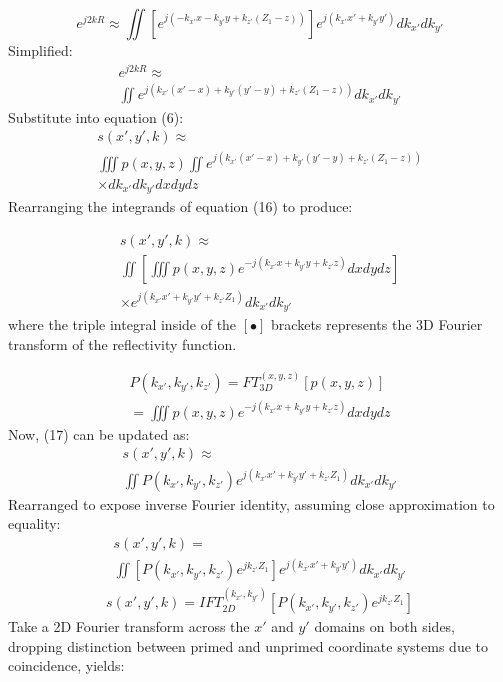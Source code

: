 \documentclass{IEEEtran}
\begin{document}
\begin{equation}
	e^{j2kR} \approx \iint \left[ e^{j(-k_{x'}x - k_{y'}y + k_{z'}(Z_1 - z) )} \right] e^{j(k_{x'}x' + k_{y'}y' ) } dk_{x'}dk_{y'}
\end{equation}
Simplified:
\begin{multline}
e^{j2kR} \approx \\
\iint e^{j(k_{x'}(x'-x) + k_{y'}(y'-y) + k_{z'}(Z_1 - z) )} dk_{x'}dk_{y'}
\end{multline}
Substitute into equation (6):
\begin{multline}
s(x',y',k) \approx \\ 
\iiint{p(x,y,z)} \iint e^{j(k_{x'}(x'-x) + k_{y'}(y'-y) + k_{z'}(Z_1 - z) )} \\
\times dk_{x'}dk_{y'} dx dy dz
\end{multline}
Rearranging the integrands of equation (16) to produce:

\begin{multline}
	s(x',y',k) \approx \\ 
	\iint \left[ \iiint p(x,y,z) e^{-j(k_{x'}x + k_{y'}y + k_{z'}z)} dxdydz \right] \\ 
	\times e^{j(k_{x'}x' + k_{y'}y' + k_{z'}Z_1)} dk_{x'}dk_{y'}
\end{multline}
where the triple integral inside of the $[\bullet]$ brackets represents the 3D Fourier transform of the reflectivity function.

\begin{multline}
	P(k_{x'},k_{y'},k_{z'}) = FT_{3D}^{(x,y,z)}[p(x,y,z)]  \\
	= \iiint p(x,y,z) e^{-j(k_{x'}x + k_{y'}y + k_{z'}z)} dxdydz
\end{multline}
Now, (17) can be updated as:
\begin{multline}
	s(x',y',k) \approx \\
	\iint P(k_{x'},k_{y'},k_{z'}) e^{j(k_{x'}x' + k_{y'}y' + k_{z'}Z_1)} dk_{x'}dk_{y'}
\end{multline}
Rearranged to expose inverse Fourier identity, assuming close approximation to equality:
\begin{multline}
s(x',y',k) = \\
\iint \left[ P(k_{x'},k_{y'},k_{z'})e^{jk_{z'}Z_1} \right] e^{j(k_{x'}x' + k_{y'}y')} dk_{x'}dk_{y'}
\end{multline}
\begin{multline}
s(x',y',k) = IFT_{2D}^{(k_{x'},k_{y'})} \left[ P(k_{x'},k_{y'},k_{z'})e^{jk_{z'}Z_1} \right] 
\end{multline}
Take a 2D Fourier transform across the $x'$ and $y'$ domains on both sides, dropping distinction between primed and unprimed coordinate systems due to coincidence, yields:
\end{document}

